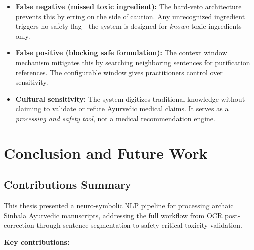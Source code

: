 \documentclass[12pt, a4paper, twoside]{report}
\begin{document}
\begin{itemize}
    \item \textbf{False negative (missed toxic ingredient):} The hard-veto architecture prevents this by erring on the side of caution. Any unrecognized ingredient triggers no safety flag—the system is designed for \textit{known} toxic ingredients only.
    
    \item \textbf{False positive (blocking safe formulation):} The context window mechanism mitigates this by searching neighboring sentences for purification references. The configurable window gives practitioners control over sensitivity.
    
    \item \textbf{Cultural sensitivity:} The system digitizes traditional knowledge without claiming to validate or refute Ayurvedic medical claims. It serves as a \textit{processing and safety tool}, not a medical recommendation engine.
\end{itemize}


\chapter{Conclusion and Future Work}
\label{ch:conclusion}

\section{Contributions Summary}
\label{sec:summary}

This thesis presented a neuro-symbolic NLP pipeline for processing archaic Sinhala Ayurvedic manuscripts, addressing the full workflow from OCR post-correction through sentence segmentation to safety-critical toxicity validation.

\textbf{Key contributions:}
\end{document}
